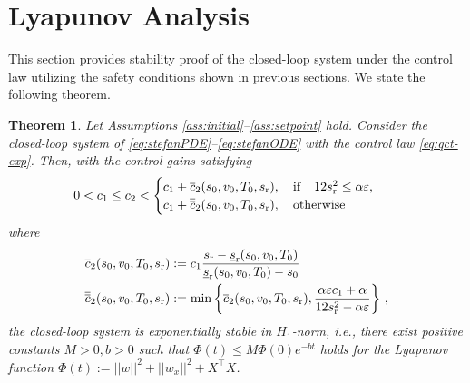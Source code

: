 \documentclass[letterpaper, 10 pt, conference]{cls/ieeeconf}
\newtheorem{theorem}{Theorem}
\theoremstyle{definition}
\newcommand{\ep}{\varepsilon}
\begin{document}
\section{Lyapunov Analysis} \label{sec:stability}

This section provides stability proof of the closed-loop system under the control law utilizing the safety conditions shown in previous sections. We state the following theorem. 
\begin{theorem}\label{thm:stability}
    Let Assumptions \ref{ass:initial}--\ref{ass:setpoint} hold. Consider the closed-loop system of \eqref{eq:stefanPDE}--\eqref{eq:stefanODE} with the control law \eqref{eq:qct-exp}.  Then, with the control gains satisfying 
    \begin{align}
    0<  c_1 & \leq   c_2 < 
        \begin{cases}
           c_1 + \overline c_2 (s_0, v_0, T_0, s_{\rm r}), \quad {\rm if} \quad 12 s_{\rm r}^2\leq \alpha \ep, \\
           c_1 +\overline{\overline{c}}_2(s_0, v_0, T_0, s_{\rm r}) , \quad {\rm otherwise}
        \end{cases} \label{eq:theorem-cond}
    \end{align}
    where 
     \begin{align}
          \overline c_2 (s_0, v_0, T_0, s_{\rm r}) & : = c_1\frac{s_{\rm r} - \underline{s}_{\rm r}(s_0, v_0, T_0)}{ \underline{s}_{\rm r}(s_0, v_0, T_0) - s_0}
          \\
          \overline{\overline{c}}_2(s_0, v_0, T_0, s_{\rm r}) &:= \min\left\{ \overline c_2 (s_0, v_0, T_0, s_{\rm r}), \frac{\alpha \ep c_1 +  \alpha }{12 s_{\rm r}^2 - \alpha \ep} \right\}\,,
     \end{align}
    the closed-loop system is exponentially stable in $H_1$-norm, i.e., there exist positive constants $M>0, b>0$ such that  $
    \Phi(t) \leq M \Phi(0) e^{-bt}$ 
holds for the Lyapunov function $\Phi(t) := || w||^2 + || w_x||^2 + X^\top X$. 
\end{theorem}
\end{document}

